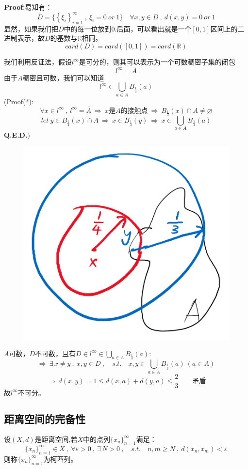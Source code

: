 \textbf{Proof:}易知有：
\[D=\{\left\{\xi_i\right\}_{i=1}^{\infty} \ , \ \xi_i=0 \ or \ 1\} \quad \forall x,y \in D \ , \ d(x,y)=0 \ or \ 1\]
显然，如果我们把$D$中的每一位放到$0.$后面，可以看出就是一个$[0,1]$区间上的二进制表示，故$D$的基数与$\mathbb{R}$相同。
\[card(D)=card([0,1])=card(\mathbb{R})\]

我们利用反证法，假设$l^{\infty}$是可分的，则其可以表示为一个可数稠密子集的闭包
\[l^{\infty}=\bar{A}\]
由于$A$稠密且可数，我们可以知道
\[l^{\infty} \in \bigcup_{a \in A}B_{\frac{1}{3}}(a) \tag{*}\]
(Proof(*): 
\[\forall x \in l^{\infty} \ , \ l^{\infty}=\bar{A} \ \Rightarrow \ x\text{是}A\text{的接触点} \ \Rightarrow \ B_{\frac{1}{4}}(x)\cap A \neq \varnothing\]
\[let \ y \in B_{\frac{1}{4}}(x)\cap A \ \Rightarrow \ x \in B_{\frac{1}{3}}(y) \ \Rightarrow \ x \in \bigcup_{a \in A}B_{\frac{1}{3}}(a)\]
\textbf{Q.E.D.})
\begin{figure}[htbp]
    \center
    \includegraphics[scale=0.5]{./fig/2.1.3_1.png}
\end{figure}

$A$可数，$D$不可数，且有$D \in l^{\infty} \in \bigcup_{a \in A}B_{\frac{1}{3}}(a)$:
\[\Rightarrow \ \exists \, x \neq y \ , \ x,y \in D \ , \quad s.t. \quad x,y \in \bigcup_{a \in A}B_{\frac{1}{3}}(a) \ (a \in A)\]
\[\Rightarrow \ d(x,y)=1 \leq d(x,a)+d(y,a) \leq \frac{2}{3} \qquad \text{矛盾}\]
故$l^{\infty}$不可分。

\subsection{距离空间的完备性}\label{complete}
\begin{definition}[柯西列]
    设$(X,d)$是距离空间,若$X$中的点列$\{x_n\}_{n=1}^{\infty}$满足：
    \[\{x_n\}_{n=1}^{\infty} \in X \ , \ \forall \varepsilon>0 \ , \ \exists \, N>0 \ , \quad s.t. \quad n,m \geq N \ , \ d(x_n,x_m)<\varepsilon\]
    则称$\{x_n\}_{n=1}^{\infty}$为柯西列。
\end{definition}


